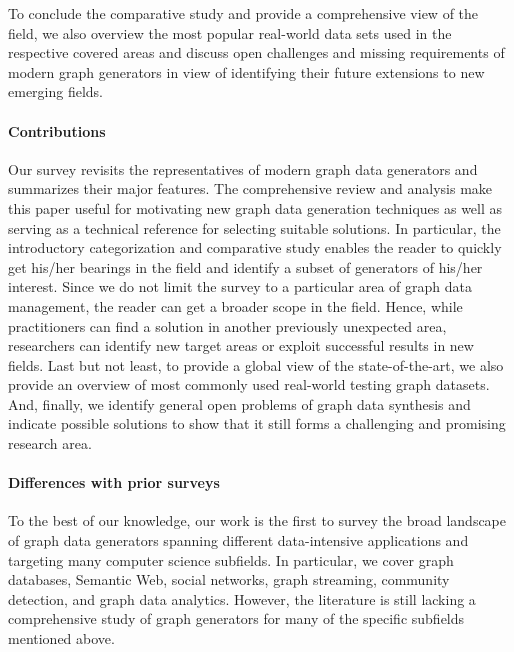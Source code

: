 To conclude the comparative study and provide a comprehensive view of the
field,  we also overview the most popular real-world data sets used in the respective covered areas and discuss open challenges and missing requirements of modern
graph generators in view of identifying their future extensions to new emerging fields.


\paragraph*{Contributions} Our survey revisits the representatives of
modern graph data generators and summarizes their major features. The comprehensive review and analysis make this paper useful for motivating new graph data generation techniques as well as serving as a technical reference for selecting suitable solutions. In particular, the introductory categorization and comparative study enables the reader to quickly get his/her bearings in the field and identify a subset of generators of his/her interest. Since we do not limit the survey to a particular area of graph data management,  the reader can get a broader scope in the field. Hence, while practitioners can find a solution in another previously unexpected area, researchers can identify new target areas or exploit successful results in new fields. Last but not least, to provide a global view of the state-of-the-art, we also provide an overview of most commonly used real-world testing graph datasets. And, finally, we identify general open problems of graph data synthesis and indicate possible solutions to show that it still forms a challenging and promising research area.

\paragraph*{Differences with prior surveys}

To the best of our knowledge, our work is the first to survey the broad
landscape of graph data generators spanning different data-intensive applications and
targeting many computer science subfields. In particular, we cover graph databases, Semantic Web, social networks, graph streaming, community detection, and graph data analytics. However, the literature is still lacking a comprehensive study of graph generators  for many of the specific subfields mentioned above.

